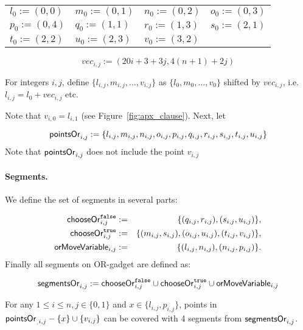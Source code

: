 

\newcommand{\clauseXFactor}{20}

\begin{center}
	\begin{tabular}{ l l l l}
		$l_0 := (0, 0)$ &
		$m_0 := (0, 1)$ &
		$n_0 := (0, 2)$ &
		$o_0 := (0, 3)$ \\
		$p_0 := (0, 4)$ &
		$q_0 := (1, 1)$ &
		$r_0 := (1, 3)$ &
		$s_0 := (2, 1)$ \\
		$t_0 := (2, 2)$ &
		$u_0 := (2, 3)$ &
		$v_0 := (3, 2)$ &
	\end{tabular}
\end{center}


$$vec_{i, j} := (\clauseXFactor i + 3 + 3j, 4(n+1) + 2j)$$

For integers $i,j$,
define 
$\{ l_{i, j}, m_{i, j}, \ldots, v_{i, j} \}$
as $\{l_0, m_0, \ldots, v_0\}$ shifted by $vec_{i, j}$,
i.e. ${l_{i,j} = l_0 + vec_{i,j}}$ etc.

Note that $v_{i, 0} = l_{i, 1}$ (see Figure~\ref{fig:apx_clause}).
Next, let

$$\mathsf{pointsOr}_{i,j} := 
 \{l_{i, j}, m_{i, j}, n_{i, j}, o_{i, j},
 p_{i, j}, q_{i, j}, r_{i, j}, s_{i, j}, t_{i, j}, u_{i, j} \}
 $$
Note that $\mathsf{pointsOr}_{i,j}$ does not include the point $v_{i,j}$
 
\paragraph{Segments.}

We define the set of segments in several parts:
 
 
\begin{eqnarray*}
\mathsf{chooseOr}^{\texttt{false}}_{i,j} &:=& \{ (q_{i, j}, r_{i, j}), (s_{i, j}, u_{i, j})\}, \\
\mathsf{chooseOr}^{\texttt{true}}_{i,j} &:=& \{ (m_{i, j}, s_{i, j}), (o_{i, j}, u_{i, j}), (t_{i, j}, v_{i, j}) \}, \\
\mathsf{orMoveVariable}_{i,j} &:=& \{ (l_{i, j}, n_{i, j}), (n_{i, j}, p_{i, j})\}.
\end{eqnarray*}
Finally all segments on OR-gadget are defined as:

$$\mathsf{segmentsOr}_{i,j} := 
  \mathsf{chooseOr}^{\texttt{false}}_{i,j} \cup \mathsf{chooseOr}^{\texttt{true}}_{i,j} \cup \mathsf{orMoveVariable}_{i,j}
$$


\begin{lemma}
\label{cover_or_true}
For any $1 \le i \le n, j \in \{0, 1\}$ and 
 $x \in \{l_{i, j}, p_{i, j}\}$, points in
${\mathsf{pointsOr}_{_,i, j} - \{ x\} \cup \{v_{i, j}\}}$
can be covered
with 4 segments from $\mathsf{segmentsOr}_{i,j}$.
\end{lemma}

